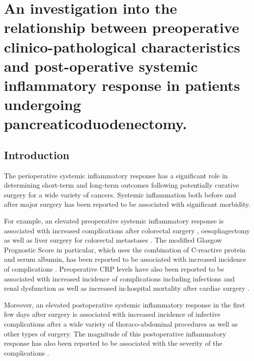 \chapter{An investigation into the relationship between preoperative clinico-pathological characteristics and post-operative systemic inflammatory response in patients undergoing pancreaticoduodenectomy.}
\label{ch_pre_post_sirs}

\clearpage


\section{Introduction}
The perioperative systemic inflammatory response has a significant role in determining short-term and long-term outcomes following potentially curative surgery for a wide variety of cancers. 
Systemic inflammation both before and after major surgery has been reported to be associated with significant morbidity. 

For example, an elevated preoperative systemic inflammatory response is associated with increased complications after colorectal surgery \parencite{moyes_preoperative_2009, kubo_elevated_2013}, oesophagectomy \parencite{vashist_glasgow_2010} as well as liver surgery for colorectal metastases \parencite{neal_preoperative_2011}. 
The modified Glasgow Prognostic Score in particular, which uses the combination of C-reactive protein and serum albumin, has been reported to be associated with increased incidence of complications \parencite{moyes_preoperative_2009, mohri_correlation_2014, vashist_glasgow_2010}.
Preoperative CRP levels have also been reported to be associated with increased incidence of complications including infections and renal dysfunction as well as increased in-hospital mortality after cardiac surgery \parencite{lorenzo_increased_2012, mezzomo_preoperative_2011, kim_predictive_2009, biancari_preoperative_2003, boeken_increased_1998}.

Moreover, an elevated postoperative systemic inflammatory response in the first few days after surgery is associated with increased incidence of infective complications after a wide variety of thoraco-abdominal procedures\parencite{singh_systematic_2014, platt_c-reactive_2012, dutta_persistent_2011, welsch_persisting_2008} as well as other types of surgery\parencite{mcneer_early_2010, laporta_baez_c-reactive_2011}.
The magnitude of this postoperative inflammatory response has also been reported to be associated with the severity of the complications \parencite{mcsorley_postoperative_2015}. 


